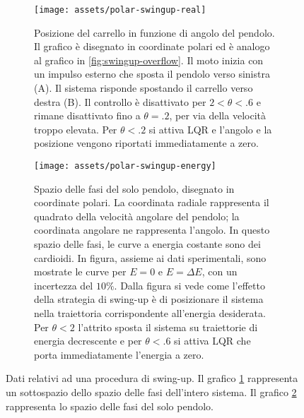 \begin{figure}
    \centering
    \begin{subfigure}[]{\textwidth}
        \centering
        \texttt{[image: assets/polar-swingup-real]}
        \caption{Posizione del carrello in funzione di angolo del pendolo.
        Il grafico è disegnato in coordinate polari ed è analogo
        al grafico in \autoref{fig:swingup-overflow}.
        Il moto inizia con un impulso esterno che sposta il pendolo
        verso sinistra (A). Il sistema risponde spostando il carrello verso
        destra (B). Il controllo è disattivato per $2 < \theta < .6$
        e rimane disattivato fino a $\theta = .2$, per via della velocità troppo
        elevata. Per $\theta < .2$ si attiva LQR e l'angolo e la posizione
        vengono riportati immediatamente a zero.
        }
        \label{fig:spazio-fasi-sistema-polare}
    \end{subfigure}

    \begin{subfigure}[]{\textwidth}
        \centering
        \texttt{[image: assets/polar-swingup-energy]}
        \caption{
            Spazio delle fasi del solo pendolo, disegnato in coordinate polari.
            La coordinata radiale rappresenta il quadrato della velocità angolare
            del pendolo; la coordinata angolare ne rappresenta l'angolo.
            In questo spazio delle fasi, le curve a energia costante sono dei
            cardioidi. In figura, assieme ai dati sperimentali, sono
            mostrate le curve per $E=0$ e $E=\Delta E$, con un incertezza del
            $10\%$. Dalla figura si vede come l'effetto della strategia di swing-up
            è di posizionare il sistema nella traiettoria corrispondente
            all'energia desiderata.
            Per $\theta < 2$ l'attrito sposta il sistema su traiettorie di
            energia decrescente e per $\theta < .6$ si attiva LQR che porta
            immediatamente l'energia a zero.
        }
        \label{fig:spazio-fasi-pendolo-polare}
    \end{subfigure}

    \caption[Dati di una procedura di swing-up]{
        Dati relativi ad una procedura di swing-up. Il grafico
        \ref{fig:spazio-fasi-sistema-polare} rappresenta un sottospazio dello
        spazio delle fasi dell'intero sistema. Il grafico
        \ref{fig:spazio-fasi-pendolo-polare} rappresenta lo spazio delle fasi del
        solo pendolo.
    }
    \label{fig:swingup-real-one}
\end{figure}

